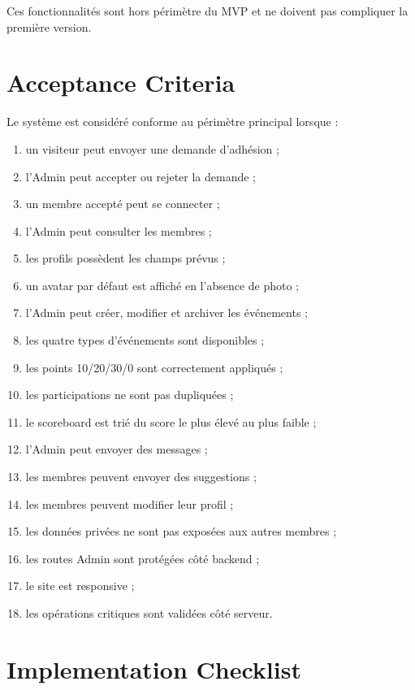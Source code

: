 \documentclass[11pt,a4paper]{report}
\begin{document}
Ces fonctionnalités sont hors périmètre du MVP et ne doivent pas compliquer la première version.

\chapter{Acceptance Criteria}

Le système est considéré conforme au périmètre principal lorsque :

\begin{enumerate}
    \item un visiteur peut envoyer une demande d'adhésion ;
    \item l'Admin peut accepter ou rejeter la demande ;
    \item un membre accepté peut se connecter ;
    \item l'Admin peut consulter les membres ;
    \item les profils possèdent les champs prévus ;
    \item un avatar par défaut est affiché en l'absence de photo ;
    \item l'Admin peut créer, modifier et archiver les événements ;
    \item les quatre types d'événements sont disponibles ;
    \item les points 10/20/30/0 sont correctement appliqués ;
    \item les participations ne sont pas dupliquées ;
    \item le scoreboard est trié du score le plus élevé au plus faible ;
    \item l'Admin peut envoyer des messages ;
    \item les membres peuvent envoyer des suggestions ;
    \item les membres peuvent modifier leur profil ;
    \item les données privées ne sont pas exposées aux autres membres ;
    \item les routes Admin sont protégées côté backend ;
    \item le site est responsive ;
    \item les opérations critiques sont validées côté serveur.
\end{enumerate}

\chapter{Implementation Checklist}
\end{document}
